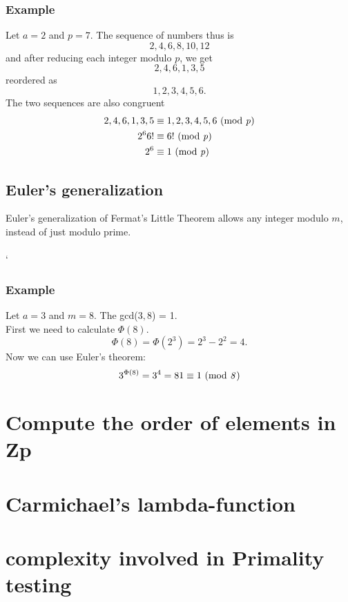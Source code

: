 \documentclass{article}
\begin{document}
 	\subsubsection*{Example}
 	Let $a = 2$ and $ p = 7$. The sequence of numbers thus is
 	$$
 	2,4,6,8,10,12
 	$$
 	and after reducing each integer modulo $p$, we get
 	$$
 	2,4,6,1,3,5
 	$$
 	reordered as
 	$$
 	1,2,3,4,5,6.
 	$$
 	The two sequences are also congruent 
 	\[
 	\begin{split}
	 	2,4,6,1,3,5 &\equiv 1,2,3,4,5,6 \text{ (mod \textit{p})}\\
	 	2^6 6! &\equiv 6! \text{ (mod \textit{p})} \\
	 	2^6 &\equiv 1 \text{ (mod \textit{p})}
 	\end{split}
 	\]
 	
 	\subsection*{Euler's generalization \cite{fermatsummary}}
 	Euler's generalization of Fermat's Little Theorem allows any integer modulo $m$, instead of just modulo prime.
 	\\
 	\\`
 	
 	\subsubsection*{Example}
 	Let $a = 3$ and $m = 8$. The gcd($3, 8$) = 1. 
 	\\
 	First we need to calculate $\Phi(8)$.
 	$$
 	\Phi(8) = \Phi(2^3) = 2^3-2^2 = 4.
 	$$
 	Now we can use Euler's theorem:
 	$$
 	3^{\Phi(8)} = 3^4 = 81 \equiv 1 \text{ (mod \textit{8})}
 	$$
 	
	\section*{Compute the order of elements in Zp} 
	
	
	\section*{Carmichael's lambda-function} 
	
	\section*{complexity involved in Primality testing}
	
\end{document}
